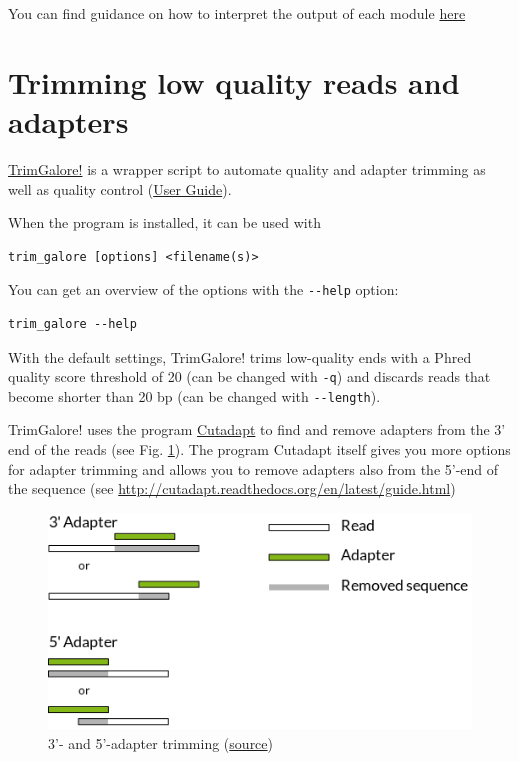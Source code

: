 \documentclass[11pt]{article}
\begin{document}
You can find guidance on how to interpret the output of each module
\href{http://www.bioinformatics.babraham.ac.uk/projects/fastqc/Help/3\%20Analysis\%20Modules/}{here} 

\section{Trimming low quality reads and adapters}
\label{sec:orgheadline5}
\href{http://www.bioinformatics.babraham.ac.uk/projects/trim_galore/}{TrimGalore!} is a wrapper script to automate quality and adapter
trimming as well as quality control (\href{http://www.bioinformatics.babraham.ac.uk/projects/trim_galore/trim_galore_User_Guide_v0.3.7.pdf}{User Guide}).

When the program is installed, it can be used with 

\begin{verbatim}
trim_galore [options] <filename(s)>
\end{verbatim}

You can get an overview of the options with the \texttt{-{}-help} option:

\begin{verbatim}
trim_galore --help
\end{verbatim}

With the default settings, TrimGalore! trims low-quality ends with a
Phred quality score threshold of 20 (can be changed with \texttt{-q}) and
discards reads that become shorter than 20 bp (can be changed with
\texttt{-{}-length}).

TrimGalore! uses the program \href{https://code.google.com/p/cutadapt/}{Cutadapt} to find and remove adapters from
the 3' end of the reads (see Fig. \ref{fig:orgparagraph1}). The program Cutadapt
itself gives you more options for adapter trimming and allows you to
remove adapters also from the 5'-end of the sequence (see
\url{http://cutadapt.readthedocs.org/en/latest/guide.html})

\begin{figure}[htb]
\centering
\includegraphics[width=14cm]{adapters.png}
\caption{\label{fig:orgparagraph1}
3'- and 5'-adapter trimming (\href{http://cutadapt.readthedocs.org/en/latest/guide.html}{source})}
\end{figure}
\end{document}
